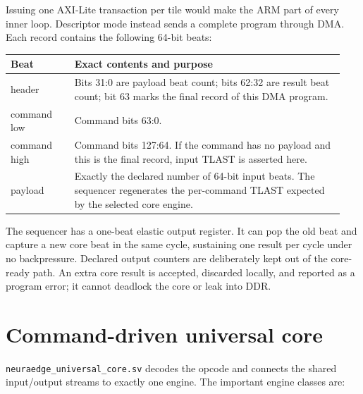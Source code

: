 \documentclass[10pt]{article}
\begin{document}
Issuing one AXI-Lite transaction per tile would make the ARM part of every
inner loop. Descriptor mode instead sends a complete program through DMA. Each
record contains the following 64-bit beats:

\begin{longtable}{>{\ttfamily}p{0.18\linewidth}p{0.76\linewidth}}
\toprule
Beat & Exact contents and purpose\\
\midrule
\endhead
header & Bits 31:0 are payload beat count; bits 62:32 are result beat count;
bit 63 marks the final record of this DMA program.\\
command low & Command bits 63:0.\\
command high & Command bits 127:64. If the command has no payload and this is
the final record, input TLAST is asserted here.\\
payload & Exactly the declared number of 64-bit input beats. The sequencer
regenerates the per-command TLAST expected by the selected core engine.\\
\bottomrule
\end{longtable}

The sequencer has a one-beat elastic output register. It can pop the old beat
and capture a new core beat in the same cycle, sustaining one result per cycle
under no backpressure. Declared output counters are deliberately kept out of
the core-ready path. An extra core result is accepted, discarded locally, and
reported as a program error; it cannot deadlock the core or leak into DDR.

\section{Command-driven universal core}

\texttt{neuraedge\_universal\_core.sv} decodes the opcode and connects the
shared input/output streams to exactly one engine. The important engine classes
are:
\end{document}
